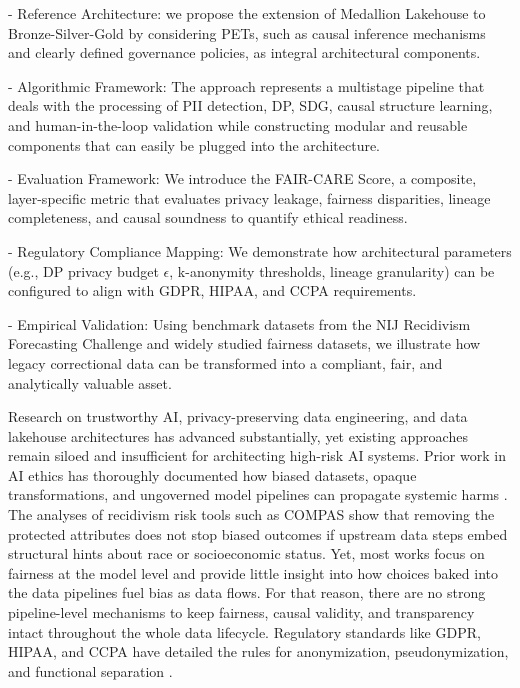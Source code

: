 - Reference Architecture: we propose the extension of Medallion Lakehouse to Bronze-Silver-Gold by considering PETs, such as causal inference mechanisms and clearly defined governance policies, as integral architectural components.

- Algorithmic Framework: The approach represents a multistage pipeline that deals with the processing of PII detection, DP, SDG, causal structure learning, and human-in-the-loop validation while constructing modular and reusable components that can easily be plugged into the architecture.

- Evaluation Framework: We introduce the FAIR-CARE Score, a composite, layer-specific metric that evaluates privacy leakage, fairness disparities, lineage completeness, and causal soundness to quantify ethical readiness.

- Regulatory Compliance Mapping: We demonstrate how architectural parameters (e.g., DP privacy budget $\epsilon$, k-anonymity thresholds, lineage granularity) can be configured to align with GDPR, HIPAA, and CCPA requirements.

- Empirical Validation: Using benchmark datasets from the NIJ Recidivism Forecasting Challenge  and widely studied fairness datasets, we illustrate how legacy correctional data can be transformed into a compliant, fair, and analytically valuable asset.


Research on trustworthy AI, privacy-preserving data engineering, and data lakehouse architectures has advanced substantially, yet existing approaches remain siloed and insufficient for architecting high-risk AI systems. Prior work in AI ethics has thoroughly documented how biased datasets, opaque transformations, and ungoverned model pipelines can propagate systemic harms . The analyses of recidivism risk tools such as COMPAS show that removing the protected attributes does not stop biased outcomes if upstream data steps embed structural hints about race or socioeconomic status. Yet, most works focus on fairness at the model level and provide little insight into how choices baked into the data pipelines fuel bias as data flows. For that reason, there are no strong pipeline-level mechanisms to keep fairness, causal validity, and transparency intact throughout the whole data lifecycle. Regulatory standards like GDPR, HIPAA, and CCPA have detailed the rules for anonymization, pseudonymization, and functional separation .

